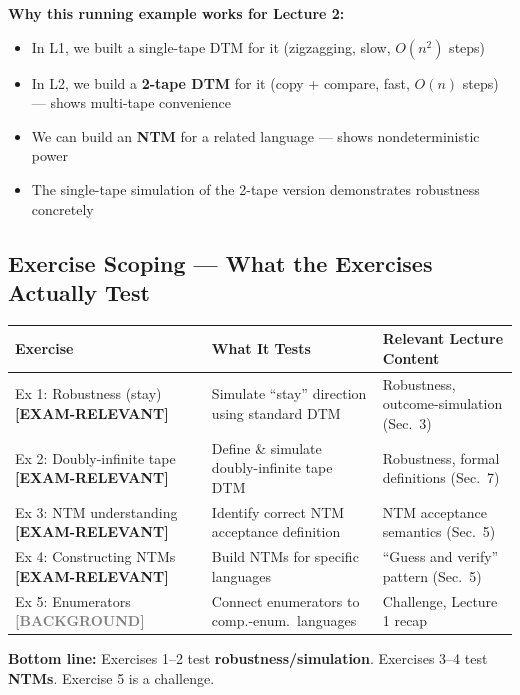\documentclass[11pt,a4paper]{article}
\newcommand{\kemark}{\textcolor{red!70!black}{\textbf{[EXAM-RELEVANT]}}}
\newcommand{\kbg}{\textcolor{gray}{\textbf{[BACKGROUND]}}}
\begin{document}
\textbf{Why this running example works for Lecture 2:}
\begin{itemize}[nosep]
\item In L1, we built a single-tape DTM for it (zigzagging, slow, $O(n^2)$ steps)
\item In L2, we build a \textbf{2-tape DTM} for it (copy + compare, fast, $O(n)$ steps) --- shows multi-tape convenience
\item We can build an \textbf{NTM} for a related language --- shows nondeterministic power
\item The single-tape simulation of the 2-tape version demonstrates robustness concretely
\end{itemize}

\subsection{Exercise Scoping --- What the Exercises Actually Test}

\begin{center}
\renewcommand{\arraystretch}{1.4}
\begin{tabular}{lp{5.5cm}p{5cm}}
\toprule
\textbf{Exercise} & \textbf{What It Tests} & \textbf{Relevant Lecture Content} \\
\midrule
Ex 1: Robustness (stay) \kemark & Simulate ``stay'' direction using standard DTM & Robustness, outcome-simulation (Sec.~3) \\
Ex 2: Doubly-infinite tape \kemark & Define \& simulate doubly-infinite tape DTM & Robustness, formal definitions (Sec.~7) \\
Ex 3: NTM understanding \kemark & Identify correct NTM acceptance definition & NTM acceptance semantics (Sec.~5) \\
Ex 4: Constructing NTMs \kemark & Build NTMs for specific languages & ``Guess and verify'' pattern (Sec.~5) \\
Ex 5: Enumerators \kbg & Connect enumerators to comp.-enum.\ languages & Challenge, Lecture 1 recap \\
\bottomrule
\end{tabular}
\end{center}

\textbf{Bottom line:} Exercises 1--2 test \textbf{robustness/simulation}. Exercises 3--4 test \textbf{NTMs}. Exercise 5 is a challenge.


\newpage
\end{document}
